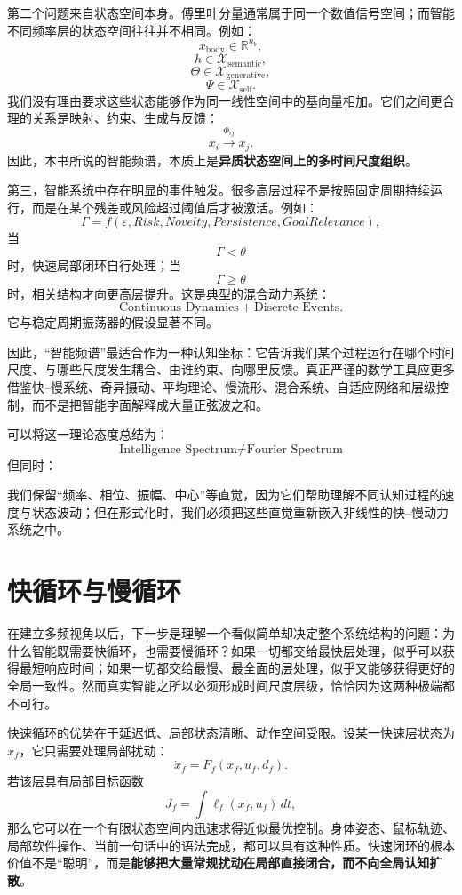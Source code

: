 第二个问题来自状态空间本身。傅里叶分量通常属于同一个数值信号空间；而智能不同频率层的状态空间往往并不相同。例如：
\[
x_{\mathrm{body}}
\in
\mathbb{R}^{n_b},
\]
\[
h
\in
\mathcal{X}_{\mathrm{semantic}},
\]
\[
\Theta
\in
\mathcal{X}_{\mathrm{generative}},
\]
\[
\Psi
\in
\mathcal{X}_{\mathrm{self}}.
\]
我们没有理由要求这些状态能够作为同一线性空间中的基向量相加。它们之间更合理的关系是映射、约束、生成与反馈：
\[
x_i
\xrightarrow{\Phi_{ij}}
x_j.
\]
因此，本书所说的智能频谱，本质上是\textbf{异质状态空间上的多时间尺度组织}。

第三，智能系统中存在明显的事件触发。很多高层过程不是按照固定周期持续运行，而是在某个残差或风险超过阈值后才被激活。例如：
\[
\Gamma
=
f
\left(
\varepsilon,
Risk,
Novelty,
Persistence,
GoalRelevance
\right),
\]
当
\[
\Gamma<\theta
\]
时，快速局部闭环自行处理；当
\[
\Gamma\geq\theta
\]
时，相关结构才向更高层提升。这是典型的混合动力系统：
\[
\text{Continuous Dynamics}
+
\text{Discrete Events}.
\]
它与稳定周期振荡器的假设显著不同。

因此，“智能频谱”最适合作为一种认知坐标：它告诉我们某个过程运行在哪个时间尺度、与哪些尺度发生耦合、由谁约束、向哪里反馈。真正严谨的数学工具应更多借鉴快--慢系统、奇异摄动、平均理论、慢流形、混合系统、自适应网络和层级控制，而不是把智能字面解释成大量正弦波之和。

可以将这一理论态度总结为：
\[
\boxed{
\text{Intelligence Spectrum}
\neq
\text{Fourier Spectrum}
}
\]
但同时：
\begin{statementbox}
\centering
{}
\end{statementbox}
我们保留“频率、相位、振幅、中心”等直觉，因为它们帮助理解不同认知过程的速度与状态波动；但在形式化时，我们必须把这些直觉重新嵌入非线性的快--慢动力系统之中。

\section{快循环与慢循环}

在建立多频视角以后，下一步是理解一个看似简单却决定整个系统结构的问题：为什么智能既需要快循环，也需要慢循环？如果一切都交给最快层处理，似乎可以获得最短响应时间；如果一切都交给最慢、最全面的层处理，似乎又能够获得更好的全局一致性。然而真实智能之所以必须形成时间尺度层级，恰恰因为这两种极端都不可行。

快速循环的优势在于延迟低、局部状态清晰、动作空间受限。设某一快速层状态为 $x_f$，它只需要处理局部扰动：
\[
\dot{x}_f
=
F_f(x_f,u_f,d_f).
\]
若该层具有局部目标函数
\[
J_f
=
\int
\ell_f(x_f,u_f)\,dt,
\]
那么它可以在一个有限状态空间内迅速求得近似最优控制。身体姿态、鼠标轨迹、局部软件操作、当前一句话中的语法完成，都可以具有这种性质。快速闭环的根本价值不是“聪明”，而是\textbf{能够把大量常规扰动在局部直接闭合，而不向全局认知扩散}。

